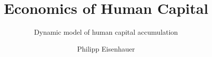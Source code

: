 

\title{Economics of Human Capital}
\subtitle{\vspace{0.3cm}Dynamic model of human capital accumulation}
\author{Philipp Eisenhauer}

\date{}

\let\otp\titlepage
